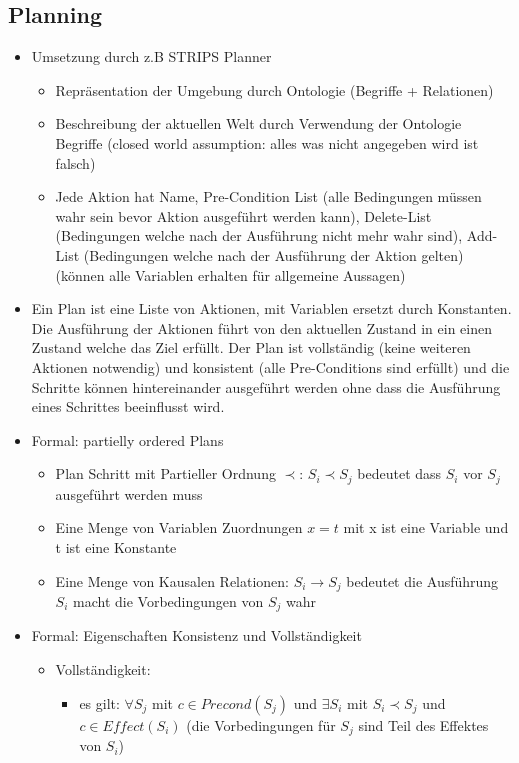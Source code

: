 \documentclass{article} %
\begin{document}
	\subsection{Planning}
	\begin{itemize}
		\item Umsetzung durch z.B STRIPS Planner
		\begin{itemize}
			\item Repräsentation der Umgebung durch Ontologie (Begriffe + Relationen)
			\item Beschreibung der aktuellen Welt durch Verwendung der Ontologie Begriffe (closed world assumption: alles was nicht angegeben wird ist falsch)
			\item Jede Aktion hat Name, Pre-Condition List (alle Bedingungen müssen wahr sein bevor Aktion ausgeführt werden kann), Delete-List (Bedingungen welche nach der Ausführung nicht mehr wahr sind), Add-List (Bedingungen welche nach der Ausführung der Aktion gelten) (können alle Variablen erhalten für allgemeine Aussagen)
		\end{itemize}
		\item Ein Plan ist eine Liste von Aktionen, mit Variablen ersetzt durch Konstanten. Die Ausführung der Aktionen führt von den aktuellen Zustand in ein einen Zustand welche das Ziel erfüllt. Der Plan ist vollständig (keine weiteren Aktionen notwendig) und konsistent (alle Pre-Conditions sind erfüllt) und die Schritte können hintereinander ausgeführt werden ohne dass die Ausführung eines Schrittes beeinflusst wird.
		\item Formal: partielly ordered Plans
		\begin{itemize}
			\item Plan Schritt mit Partieller Ordnung $\prec$: $S_{i} \prec S_{j}$ bedeutet dass $S_{i}$ vor $S_{j}$ ausgeführt werden muss
			\item Eine Menge von Variablen Zuordnungen $x=t$ mit x ist eine Variable und t ist eine Konstante
			\item Eine Menge von Kausalen Relationen: $S_{i} \rightarrow S_{j}$ bedeutet die Ausführung $S_{i}$ macht die Vorbedingungen von $S_{j}$ wahr
		\end{itemize}
		\item Formal: Eigenschaften Konsistenz und Vollständigkeit
		\begin{itemize}
			\item Vollständigkeit: 
			\begin{itemize}
				\item es gilt: $\forall S_{j}$ mit $c\in Precond(S_{j})$ und $\exists S_{i}$ mit $S_{i} \prec S_{j}$ und $c\in Effect(S_{i})$ (die Vorbedingungen für $S_{j}$ sind Teil des Effektes von $S_{i}$)

\end{itemize}
\end{itemize}
\end{itemize}
\end{document}
